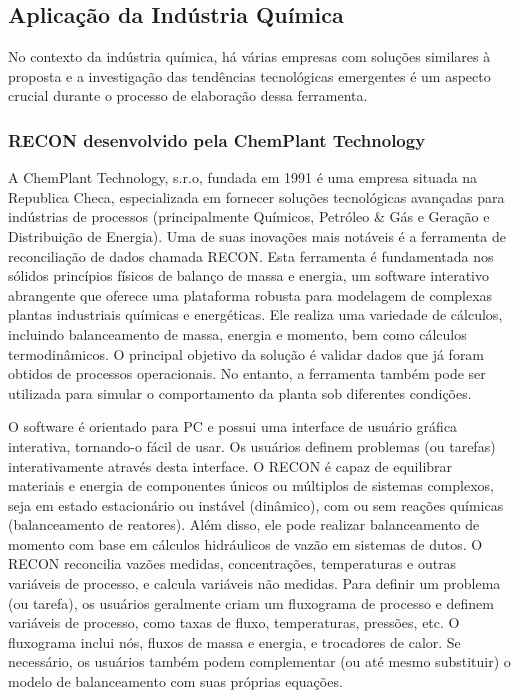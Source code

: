 \subsection{Aplicação da Indústria Química}

No contexto da indústria química, há várias empresas com soluções similares à proposta e a investigação das tendências tecnológicas emergentes é um aspecto crucial durante o processo de elaboração dessa ferramenta. 

\subsubsection{RECON desenvolvido pela ChemPlant Technology}

A ChemPlant Technology, s.r.o, fundada em 1991 é uma empresa situada na Republica Checa, especializada em fornecer soluções tecnológicas avançadas para indústrias de processos (principalmente Químicos, Petróleo & Gás e Geração e Distribuição de Energia). Uma de suas inovações mais notáveis é a ferramenta de reconciliação de dados chamada RECON. Esta ferramenta é fundamentada nos sólidos princípios físicos de balanço de massa e energia, um software interativo abrangente que oferece uma plataforma robusta para modelagem de complexas plantas industriais químicas e energéticas. Ele realiza uma variedade de cálculos, incluindo balanceamento de massa, energia e momento, bem como cálculos termodinâmicos. O principal objetivo da solução é validar dados que já foram obtidos de processos operacionais. No entanto, a ferramenta também pode ser utilizada para simular o comportamento da planta sob diferentes condições.

O software é orientado para PC e possui uma interface de usuário gráfica interativa, tornando-o fácil de usar. Os usuários definem problemas (ou tarefas) interativamente através desta interface. O RECON é capaz de equilibrar materiais e energia de componentes únicos ou múltiplos de sistemas complexos, seja em estado estacionário ou instável (dinâmico), com ou sem reações químicas (balanceamento de reatores). Além disso, ele pode realizar balanceamento de momento com base em cálculos hidráulicos de vazão em sistemas de dutos. O RECON reconcilia vazões medidas, concentrações, temperaturas e outras variáveis de processo, e calcula variáveis não medidas. Para definir um problema (ou tarefa), os usuários geralmente criam um fluxograma de processo e definem variáveis de processo, como taxas de fluxo, temperaturas, pressões, etc. O fluxograma inclui nós, fluxos de massa e energia, e trocadores de calor. Se necessário, os usuários também podem complementar (ou até mesmo substituir) o modelo de balanceamento com suas próprias equações.

